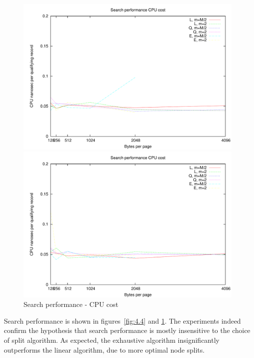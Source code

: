 \begin{figure}
\centering
\begin{minipage}{0.49\textwidth}
\centering
\includegraphics[width=\textwidth]{fig/random/figure-4-5.pdf}
\end{minipage}
\begin{minipage}{0.49\textwidth}
\centering
\includegraphics[width=\textwidth]{fig/usppp/figure-4-5.pdf}
\end{minipage}
\caption{Search performance - CPU cost}
\label{fig:4.5}
\end{figure}

Search performance is shown in figures~\ref{fig:4.4} and \ref{fig:4.5}. The experiments indeed confirm the hypothesis that search performance is mostly insensitive to the choice of split algorithm. As expected, the exhaustive algorithm insignificantly outperforms the linear algorithm, due to more optimal node splits.

